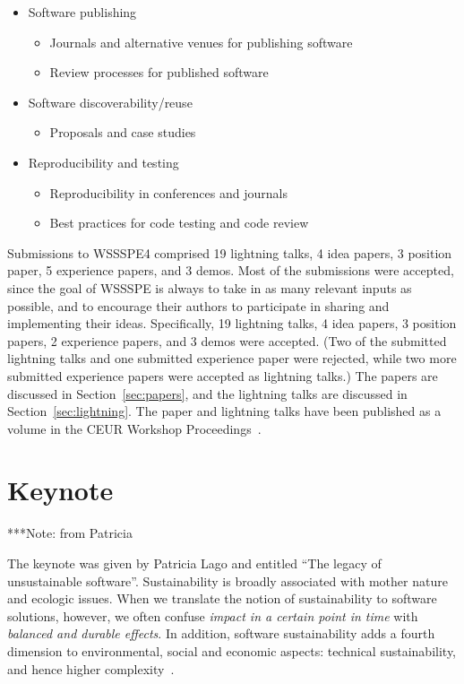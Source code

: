 \documentclass[11pt, oneside]{amsart}
\newcommand{\note}[1]{ {\textcolor{blueish}    { ***Note:      #1 }}}
\begin{document}
\begin{itemize}
\item Software publishing
\begin{itemize}
    \item Journals and alternative venues for publishing software
    \item Review processes for published software
\end{itemize}

\item Software discoverability/reuse
\begin{itemize}
    \item Proposals and case studies
\end{itemize}

\item Reproducibility and testing
\begin{itemize}
    \item Reproducibility in conferences and journals
    \item Best practices for code testing and code review
\end{itemize}

\end{itemize}

Submissions to WSSSPE4 comprised
19 lightning talks,
4 idea papers,
3 position paper,
5 experience papers,
and
3 demos.
Most of the submissions were accepted, since the goal of WSSSPE is always to
take in as many relevant inputs as possible, and to encourage their authors to
participate in sharing and implementing their ideas.
Specifically,
19 lightning talks,
4 idea papers,
3 position papers,
2 experience papers,
and
3 demos
were accepted. (Two of the submitted lightning talks and one submitted experience paper were rejected, while two more submitted experience papers
were accepted as lightning talks.)
The papers are discussed in Section~\ref{sec:papers},
and the lightning talks are discussed in Section~\ref{sec:lightning}.
The paper and lightning talks have been published as a volume in the CEUR Workshop Proceedings~\cite{WSSSPE4-proceedings}.

\section{Keynote}\label{sec:keynote}

\note{from Patricia}

The keynote was given by Patricia Lago and entitled ``The legacy of unsustainable software''.
%
Sustainability is broadly associated with mother nature and ecologic issues. When we translate the notion of sustainability to software solutions, however, we often confuse {\em impact in a certain point in time} with {\em balanced and durable effects}. In addition, software sustainability adds a fourth dimension to environmental, social and economic aspects: technical sustainability, and hence higher complexity~\cite{Lago2015}. 
\end{document}
